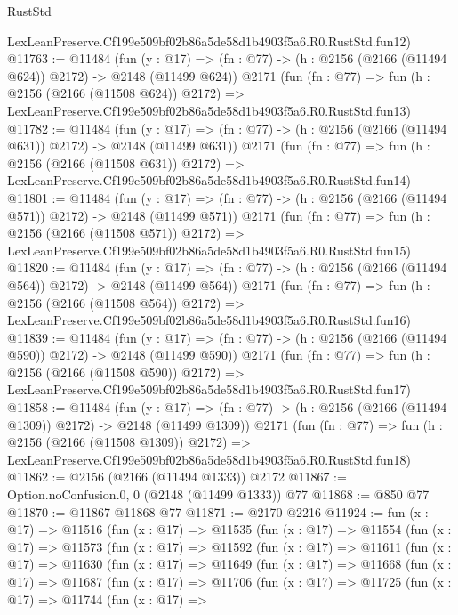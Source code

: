 \begin{lexlean}{RustStd}
\begin{coremodule}
    LexLeanPreserve.Cf199e509bf02b86a5de58d1b4903f5a6.R0.RustStd.fun12)
@11763 := @11484
    (fun (y : @17) => (fn : @77) -> (h : @2156 (@2166 (@11494 @624)) @2172) -> @2148 (@11499 @624))
    @2171
    (fun (fn : @77) =>
    fun (h : @2156 (@2166 (@11508 @624)) @2172) =>
    LexLeanPreserve.Cf199e509bf02b86a5de58d1b4903f5a6.R0.RustStd.fun13)
@11782 := @11484
    (fun (y : @17) => (fn : @77) -> (h : @2156 (@2166 (@11494 @631)) @2172) -> @2148 (@11499 @631))
    @2171
    (fun (fn : @77) =>
    fun (h : @2156 (@2166 (@11508 @631)) @2172) =>
    LexLeanPreserve.Cf199e509bf02b86a5de58d1b4903f5a6.R0.RustStd.fun14)
@11801 := @11484
    (fun (y : @17) => (fn : @77) -> (h : @2156 (@2166 (@11494 @571)) @2172) -> @2148 (@11499 @571))
    @2171
    (fun (fn : @77) =>
    fun (h : @2156 (@2166 (@11508 @571)) @2172) =>
    LexLeanPreserve.Cf199e509bf02b86a5de58d1b4903f5a6.R0.RustStd.fun15)
@11820 := @11484
    (fun (y : @17) => (fn : @77) -> (h : @2156 (@2166 (@11494 @564)) @2172) -> @2148 (@11499 @564))
    @2171
    (fun (fn : @77) =>
    fun (h : @2156 (@2166 (@11508 @564)) @2172) =>
    LexLeanPreserve.Cf199e509bf02b86a5de58d1b4903f5a6.R0.RustStd.fun16)
@11839 := @11484
    (fun (y : @17) => (fn : @77) -> (h : @2156 (@2166 (@11494 @590)) @2172) -> @2148 (@11499 @590))
    @2171
    (fun (fn : @77) =>
    fun (h : @2156 (@2166 (@11508 @590)) @2172) =>
    LexLeanPreserve.Cf199e509bf02b86a5de58d1b4903f5a6.R0.RustStd.fun17)
@11858 := @11484
    (fun (y : @17) =>
    (fn : @77) -> (h : @2156 (@2166 (@11494 @1309)) @2172) -> @2148 (@11499 @1309))
    @2171
    (fun (fn : @77) =>
    fun (h : @2156 (@2166 (@11508 @1309)) @2172) =>
    LexLeanPreserve.Cf199e509bf02b86a5de58d1b4903f5a6.R0.RustStd.fun18)
@11862 := @2156 (@2166 (@11494 @1333)) @2172
@11867 := Option.noConfusion.{0, 0} (@2148 (@11499 @1333)) @77
@11868 := @850 @77
@11870 := @11867 @11868 @77
@11871 := @2170 @2216
@11924 := fun (x : @17) =>
  @11516
    (fun (x : @17) =>
    @11535
      (fun (x : @17) =>
      @11554
        (fun (x : @17) =>
        @11573
          (fun (x : @17) =>
          @11592
            (fun (x : @17) =>
            @11611
              (fun (x : @17) =>
              @11630
                (fun (x : @17) =>
                @11649
                  (fun (x : @17) =>
                  @11668
                    (fun (x : @17) =>
                    @11687
                      (fun (x : @17) =>
                      @11706
                        (fun (x : @17) =>
                        @11725
                          (fun (x : @17) =>
                          @11744
                            (fun (x : @17) =>

\end{coremodule}
\end{lexlean}
